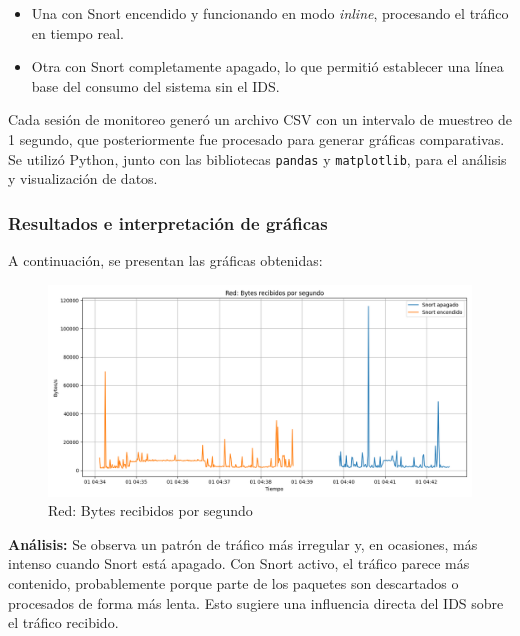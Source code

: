 \documentclass[12pt,a4paper]{report}
\begin{document}
\begin{itemize}
	\item Una con Snort encendido y funcionando en modo \textit{inline}, procesando el tráfico en tiempo real.
	\item Otra con Snort completamente apagado, lo que permitió establecer una línea base del consumo del sistema sin el IDS.
\end{itemize}

Cada sesión de monitoreo generó un archivo CSV con un intervalo de muestreo de 1 segundo, que posteriormente fue procesado para generar gráficas comparativas. Se utilizó Python, junto con las bibliotecas \texttt{pandas} y \texttt{matplotlib}, para el análisis y visualización de datos.

\subsubsection{Resultados e interpretación de gráficas}

A continuación, se presentan las gráficas obtenidas:

\begin{figure}[H]
	\centering
	\includegraphics[width=\textwidth]{graficas/net_recv.png}
	\caption{Red: Bytes recibidos por segundo}
\end{figure}
\textbf{Análisis:} Se observa un patrón de tráfico más irregular y, en ocasiones, más intenso cuando Snort está apagado. Con Snort activo, el tráfico parece más contenido, probablemente porque parte de los paquetes son descartados o procesados de forma más lenta. Esto sugiere una influencia directa del IDS sobre el tráfico recibido.
\end{document}
